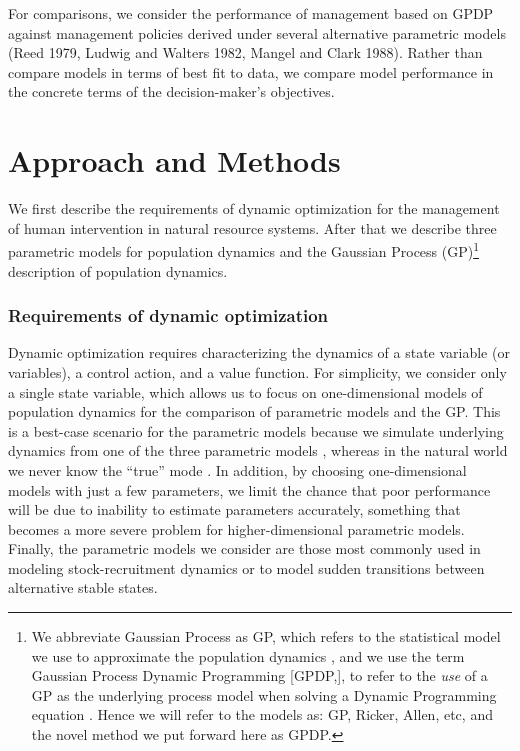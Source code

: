 \documentclass[author-year, 12pt,review]{components/elsarticle} %
\begin{document}
For comparisons, we consider the performance of management based on GPDP
against management policies derived under several alternative parametric
models (Reed 1979, Ludwig and Walters 1982, Mangel and Clark 1988).
Rather than compare models in terms of best fit to data, we compare
model performance in the concrete terms of the decision-maker's
objectives.

\section{Approach and Methods}\label{approach-and-methods}

We first describe the requirements of dynamic optimization for the
management of human intervention in natural resource systems. After that
we describe three parametric models for population dynamics and the
Gaussian Process (GP)\footnote{We abbreviate Gaussian Process as GP,
  which refers to the statistical model we use to approximate the
  population dynamics , and we use the term Gaussian Process Dynamic
  Programming {[}GPDP,{]}, to refer to the \emph{use} of a GP as the
  underlying process model when solving a Dynamic Programming equation .
  Hence we will refer to the models as: GP, Ricker, Allen, etc, and the
  novel method we put forward here as GPDP.} description of population
dynamics.

\subsubsection{Requirements of dynamic
optimization}\label{requirements-of-dynamic-optimization}

Dynamic optimization requires characterizing the dynamics of a state
variable (or variables), a control action, and a value function. For
simplicity, we consider only a single state variable, which allows us to
focus on one-dimensional models of population dynamics for the
comparison of parametric models and the GP. This is a best-case scenario
for the parametric models because we simulate underlying dynamics from
one of the three parametric models , whereas in the natural world we
never know the ``true'' mode . In addition, by choosing one-dimensional
models with just a few parameters, we limit the chance that poor
performance will be due to inability to estimate parameters accurately,
something that becomes a more severe problem for higher-dimensional
parametric models. Finally, the parametric models we consider are those
most commonly used in modeling stock-recruitment dynamics or to model
sudden transitions between alternative stable states.
\end{document}
